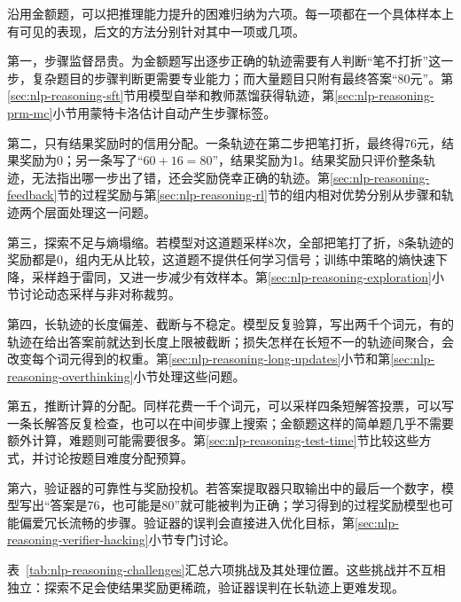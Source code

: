 沿用金额题，可以把推理能力提升的困难归纳为六项。每一项都在一个具体样本上有可见的表现，后文的方法分别针对其中一项或几项。

第一，步骤监督昂贵。为金额题写出逐步正确的轨迹需要有人判断“笔不打折”这一步，复杂题目的步骤判断更需要专业能力；而大量题目只附有最终答案“80元”。第\ref{sec:nlp-reasoning-sft}节用模型自举和教师蒸馏获得轨迹，第\ref{sec:nlp-reasoning-prm-mc}小节用蒙特卡洛估计自动产生步骤标签。

第二，只有结果奖励时的信用分配。一条轨迹在第二步把笔打折，最终得76元，结果奖励为0；另一条写了“$60+16=80$”，结果奖励为1。结果奖励只评价整条轨迹，无法指出哪一步出了错，还会奖励侥幸正确的轨迹。第\ref{sec:nlp-reasoning-feedback}节的过程奖励与第\ref{sec:nlp-reasoning-rl}节的组内相对优势分别从步骤和轨迹两个层面处理这一问题。

第三，探索不足与熵塌缩。若模型对这道题采样8次，全部把笔打了折，8条轨迹的奖励都是0，组内无从比较，这道题不提供任何学习信号；训练中策略的熵快速下降，采样趋于雷同，又进一步减少有效样本。第\ref{sec:nlp-reasoning-exploration}小节讨论动态采样与非对称裁剪。

第四，长轨迹的长度偏差、截断与不稳定。模型反复验算，写出两千个词元，有的轨迹在给出答案前就达到长度上限被截断；损失怎样在长短不一的轨迹间聚合，会改变每个词元得到的权重。第\ref{sec:nlp-reasoning-long-updates}小节和第\ref{sec:nlp-reasoning-overthinking}小节处理这些问题。

第五，推断计算的分配。同样花费一千个词元，可以采样四条短解答投票，可以写一条长解答反复检查，也可以在中间步骤上搜索；金额题这样的简单题几乎不需要额外计算，难题则可能需要很多。第\ref{sec:nlp-reasoning-test-time}节比较这些方式，并讨论按题目难度分配预算。

第六，验证器的可靠性与奖励投机。若答案提取器只取输出中的最后一个数字，模型写出“答案是76，也可能是80”就可能被判为正确；学习得到的过程奖励模型也可能偏爱冗长流畅的步骤。验证器的误判会直接进入优化目标，第\ref{sec:nlp-reasoning-verifier-hacking}小节专门讨论。

表~\ref{tab:nlp-reasoning-challenges}汇总六项挑战及其处理位置。这些挑战并不互相独立：探索不足会使结果奖励更稀疏，验证器误判在长轨迹上更难发现。

